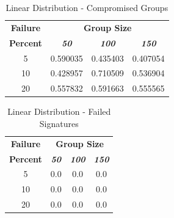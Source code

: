 \documentclass[conference]{IEEEtran}
\begin{document}
        \begin{table}[h!]
            \caption{Linear Distribution - Compromised Groups}
            \begin{center}
            \begin{tabular}{|c|c|c|c|}
            \hline
            \textbf{Failure}&\multicolumn{3}{|c|}{\textbf{Group Size}} \\
            \cline{2-4} 
            \textbf{Percent} & \textbf{\textit{50}}& \textbf{\textit{100}}& \textbf{\textit{150}} \\
            \hline
            5 &  0.590035 &  0.435403 &  0.407054 \\
            \hline
            10 &  0.428957 &  0.710509 &  0.536904 \\
            \hline
            20 &  0.557832 &  0.591663 &  0.555565 \\
            \hline
            \end{tabular}
            \label{compromised_table1}
            \end{center}
        \end{table}

        \begin{table}[h!]
            \caption{Linear Distribution - Failed Signatures}
            \begin{center}
            \begin{tabular}{|c|c|c|c|}
            \hline
            \textbf{Failure}&\multicolumn{3}{|c|}{\textbf{Group Size}} \\
            \cline{2-4} 
            \textbf{Percent} & \textbf{\textit{50}}& \textbf{\textit{100}}& \textbf{\textit{150}} \\
            \hline
            5 &  0.0 &  0.0 &  0.0 \\
            \hline
            10 &  0.0 &  0.0 &  0.0 \\
            \hline
            20 &  0.0 &  0.0 &  0.0 \\
            \hline
            \end{tabular}
            \label{failed_table1}
            \end{center}
        \end{table}
\end{document}

